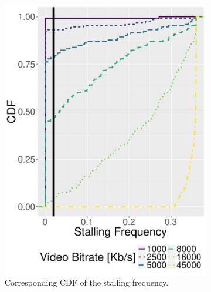 \begin{figure}[!t]
    \begin{subfigure}[b]{0.45\columnwidth}
        \includegraphics[width=\textwidth]{images/stallingfreq-cdf.pdf}
        \caption{Corresponding CDF of the stalling frequency.}
        \label{fig:stallingfreq-cdf}
    \end{subfigure}
    ~
    \begin{subfigure}[b]{0.45\columnwidth}

\end{subfigure}
\end{figure}
